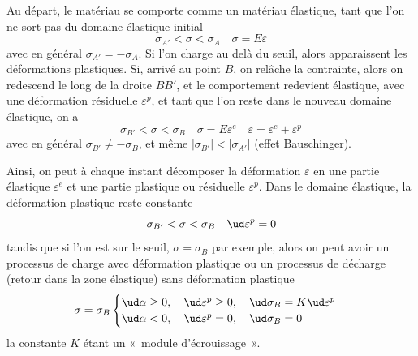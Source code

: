 Au départ, le matériau se comporte comme un matériau élastique, tant que l'on ne sort pas du domaine élastique initial 
\begin{equation}
    \sigma_{A'} < \sigma < \sigma_A \quad \sigma = E \varepsilon
    \label{eq:Ch10-001}
\end{equation}
avec en général $\sigma_{A'} = - \sigma_A$.
Si l'on charge au delà du seuil, alors apparaissent les déformations plastiques.
Si, arrivé au point $B$, on relâche la contrainte, alors on redescend le long de la droite $BB'$, et le comportement redevient élastique, avec une déformation résiduelle $\varepsilon^p$, et tant que l'on reste dans le nouveau domaine élastique, on a 
\begin{equation}
    \sigma_{B'} < \sigma <\sigma_B \quad \sigma=E \varepsilon^e \quad \varepsilon = \varepsilon^e + \varepsilon^p
    \label{eq:Ch10-002}
\end{equation}
avec en général $\sigma_{B'}\neq - \sigma_{B}$, et même $|\sigma_{B'}|<|\sigma_{A'}|$ (effet Bauschinger). 

Ainsi, on peut à chaque instant décomposer la déformation $\varepsilon$ en une partie élastique $\varepsilon^e$ et une partie plastique ou résiduelle $\varepsilon^p$.
Dans le domaine élastique, la déformation plastique reste constante 
\begin{equation}
    \sigma_{B'} < \sigma <\sigma_B \quad \ud \varepsilon^p = 0
    \label{eq:Ch10-003}
\end{equation}
tandis que si l'on est sur le seuil, $\sigma = \sigma_B$ par exemple, alors on peut avoir un processus de charge avec déformation plastique ou un processus de décharge (retour dans la zone élastique) sans déformation plastique 
\begin{equation}
    \sigma = \sigma_B 
    \begin{cases}
        \ud \alpha \geq 0, \quad \ud \varepsilon^p \geq 0, \quad \ud \sigma_B = K \ud \varepsilon^p \\
        \ud \alpha < 0, \quad \ud \varepsilon^p = 0, \quad \ud \sigma_B = 0
    \end{cases}
    \label{eq:Ch10-004}
\end{equation}
la constante $K$ étant un «~module d'écrouissage~».

